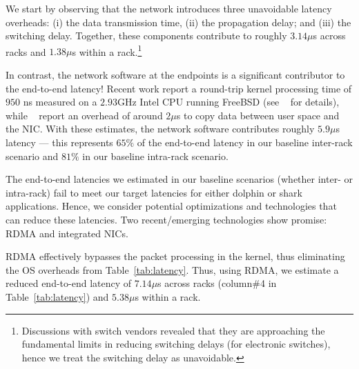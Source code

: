 We start by observing that the network introduces three unavoidable latency overheads: (i) the data transmission time, (ii) the propagation delay; and (iii) the switching delay. 
Together, these components contribute to roughly $3.14\mu$s across racks and $1.38\mu$s within a rack.\footnote{Discussions with switch vendors revealed that they are approaching the fundamental limits in reducing switching delays (for electronic switches), hence we treat the switching delay as unavoidable.} 

In contrast, the network software at the endpoints is a significant contributor to the end-to-end latency! Recent work report a round-trip kernel processing time of $950$ ns measured on a $2.93$GHz Intel CPU running FreeBSD (see ~\cite{luigi} for details), while ~\cite{ramcloud} report 
an overhead of around $2\mu$s to copy data between user space and the NIC.
With these estimates, the network software contributes roughly $5.9\mu$s latency --- this represents $65\%$ of the end-to-end latency in our baseline inter-rack scenario and $81\%$ in our baseline intra-rack scenario.

The end-to-end latencies we estimated in our baseline scenarios (whether inter- or intra-rack) 
fail to meet our target latencies for either dolphin or shark applications. Hence, we consider potential optimizations and technologies that can reduce these latencies. 
Two recent/emerging technologies show promise: RDMA and integrated NICs.




RDMA effectively bypasses the packet processing in the kernel, thus eliminating the OS overheads from Table~\ref{tab:latency}. Thus, using RDMA, we estimate a reduced end-to-end latency of $7.14\mu$s across racks (column\#4 in Table~\ref{tab:latency}) 
and $5.38\mu$s within a rack.


